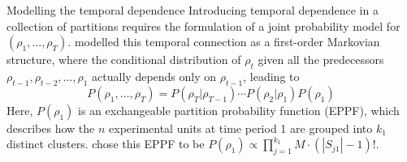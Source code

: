 \documentclass[
	11pt, %
 xcolor={dvipsnames,svgnames}
]{beamer}
\let\cite\citep
\begin{document}
\begin{frame}{Modelling the temporal dependence}
Introducing temporal dependence in a collection of partitions requires the formulation of a joint probability model for $(\rho_1, \ldots, \rho_T)$. \citet{1-drpm} modelled this temporal connection as a first-order Markovian structure, where the conditional distribution of $\rho_t$ given all the predecessors $\rho_{t-1}, \rho_{t-2}, \ldots, \rho_1$ actually depends only on $\rho_{t-1}$, leading to 
\begin{equation}
P(\rho_1, \ldots, \rho_T) = P(\rho_T|\rho_{T-1}) \cdots P(\rho_2|\rho_1) P(\rho_1)
\label{P rhos 1}
\end{equation}
Here, $P(\rho_1)$ is an exchangeable partition probability function (EPPF), which describes how the $n$ experimental units at time period 1 are grouped into $k_1$ distinct clusters. \citet{1-drpm} chose this EPPF to be $P(\rho_1) \propto \prod_{j=1}^{k_1} M\cdot(|S_{j1}|-1)! $.

\end{frame}
\end{document}
